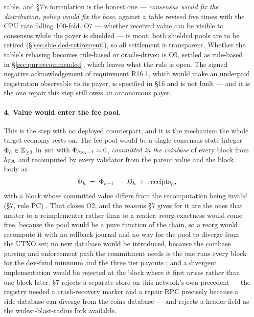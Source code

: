 table, and \S7's formulation is the honest one --- \emph{consensus would fix the distribution, policy
would fix the base}, against a table revised five times with the CPU rate falling \num{100}-fold.
O7 --- whether received value can be visible to consensus while the payer is shielded --- is moot:
both shielded pools are to be retired (\S\ref{sec:shielded-retirement}), so all settlement is
transparent. Whether the table's rebasing becomes rule-based or oracle-driven is O9, settled as rule-based in
\S\ref{sec:pnr:recommended}, which leaves what the rule is open.
The signed negative acknowledgement of requirement R16.1, which would make an underpaid registration
observable to its payer, is specified in \S16 and is not built --- and it is the one repair this step
still owes an autonomous payer.

\paragraph{4. Value would enter the fee pool.}
This is the step with no deployed counterpart, and it is the mechanism the whole target economy rests
on. The fee pool would be a single consensus-state integer $\Phi_{h} \in \mathbb{Z}_{\ge 0}$ in
$\,\mathrm{sat}$ with $\Phi_{h_{\mathrm{PA}}-1} = 0$, \emph{committed in the coinbase} of every block from $h_{\mathrm{PA}}$ and
recomputed by every validator from the parent value and the block body as
\[
  \Phi_{h} \;=\; \Phi_{h-1} \;-\; D_{h} \;+\; \text{receipts}_{h} ,
\]
with a block whose committed value differs from the recomputation being invalid (\S7, rule PC)
 . That closes O2, and
the reasons \S7 gives for it are the ones that matter to a reimplementer rather than to a reader:
reorg-exactness would come free, because the pool would be a pure function of the chain, so a reorg
would recompute it with no rollback journal and no way for the pool to diverge from the UTXO set; no
new database would be introduced, because the coinbase parsing and enforcement path the commitment
needs is the one \fluxd runs every block for the dev-fund minimum and the three tier payouts
\shipped; and a divergent implementation would be rejected at the block where it first arises rather
than one block later. \S7 rejects a separate store on this network's own
precedent --- the \FluxNode registry needed a crash-recovery marker and a repair RPC precisely
because a side database can diverge from the coins database --- and rejects a header field as the
widest-blast-radius fork available.

